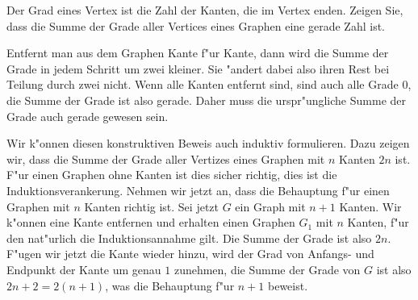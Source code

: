 Der Grad eines Vertex ist die Zahl der Kanten, die im Vertex enden.
Zeigen Sie, dass die Summe der Grade aller Vertices eines Graphen
eine gerade Zahl ist.

\begin{loesung}
Entfernt man aus dem Graphen Kante f"ur Kante, dann wird die
Summe der Grade in jedem Schritt um zwei kleiner. Sie "andert
dabei also ihren Rest bei Teilung durch zwei nicht. Wenn alle
Kanten entfernt sind, sind auch alle Grade 0, die Summe der
Grade ist also gerade. Daher muss die urspr"ungliche Summe der
Grade auch gerade gewesen sein.

Wir k"onnen diesen konstruktiven Beweis auch induktiv formulieren.
Dazu zeigen wir, dass die Summe der Grade aller Vertizes eines Graphen
mit $n$ Kanten $2n$ ist. F"ur einen Graphen ohne Kanten ist dies
sicher richtig, dies ist die Induktionsverankerung. Nehmen wir
jetzt an, dass die Behauptung f"ur einen Graphen mit $n$ Kanten
richtig ist. Sei jetzt $G$ ein Graph mit $n+1$ Kanten. Wir k"onnen
eine Kante entfernen und erhalten einen Graphen $G_1$ mit $n$
Kanten, f"ur den nat"urlich die Induktionsannahme gilt. Die Summe
der Grade ist also $2n$. F"ugen wir jetzt die Kante wieder hinzu,
wird der Grad von Anfangs- und Endpunkt der Kante um genau $1$
zunehmen, die Summe der Grade von $G$ ist also $2n+2=2(n+1)$,
was die Behauptung f"ur $n+1$ beweist.
\end{loesung}

